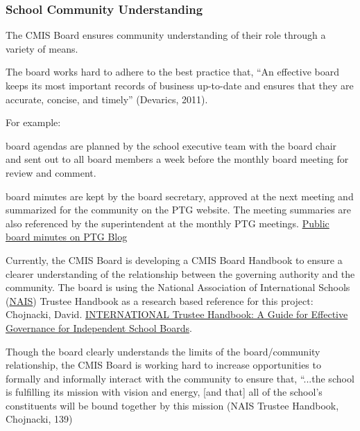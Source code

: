 \subsubsection{School Community Understanding}



\begin{findings}
The CMIS Board ensures community understanding of their role through a variety of means. 

The board works hard to adhere to the best practice that, ``An effective board keeps its most important records of business up-to-date and ensures that they are accurate, concise, and timely'' (Devarics, 2011).

For example:

board agendas are planned by the school executive team with the board chair and sent out to all board members a week before the monthly board meeting for review and comment. 

board minutes are kept by the board secretary, approved at the next meeting and summarized for the community on the PTG website. The meeting summaries are also referenced by the superintendent at the monthly PTG meetings. \href{http://blogs.cmis.ac.th/ptg/public-board-minutes/}{Public board minutes on PTG Blog}

Currently, the CMIS Board is developing a CMIS Board Handbook to ensure a clearer understanding of the relationship between the governing authority and the community. The board is using the National Association of International Schools (\href{http://www.nais.org/Articles/Pages/NAIS-Trustee-Handbook-Resources.aspx}{NAIS}) Trustee Handbook as a research based reference for this project: Chojnacki, David. \href{https://www.nais.org/Bookstore/Pages/ProductDetail.aspx?productid=\%7B47CD9104-BC67-E111-9A8C-00505683000D\%7D}{INTERNATIONAL Trustee Handbook: A Guide for Effective Governance for Independent School Boards}. 

Though the board clearly understands the limits of the board/community relationship, the CMIS Board is working hard to increase opportunities to formally and informally interact with the community to ensure that, “...the school is fulfilling its mission with vision and energy, [and that] all  of the school’s constituents will be bound together by this mission (NAIS Trustee Handbook, Chojnacki, 139)  


\end{findings}
